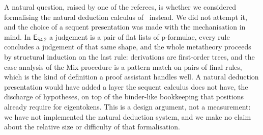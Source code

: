 \documentclass{article}
\newcommand{\spotlight}[1]{#1}
\newcommand{\eseq}{\mathsf{E}_{{\textsf{S4.2}}}}
\theoremstyle{definition}
\begin{document}
A natural question, raised by one of the referees, is whether we considered formalising the natural deduction calculus of~\cite{Martini2024:S42NaturalDeduction} instead. We did not attempt it, and the choice of a sequent presentation was made with the mechanisation in mind. In $\eseq$ a judgement is a pair of flat lists of p-formulae, every rule concludes a judgement of that same shape, and the whole metatheory proceeds by structural induction on the last rule: derivations are first-order trees, and the case analysis of the Mix procedure is a pattern match on pairs of final rules, which is the kind of definition a proof assistant handles well. A natural deduction presentation would have added a layer the sequent calculus does not have, the discharge of hypotheses, on top of the binder-like bookkeeping that positions already require for eigentokens. \spotlight{This is a design argument, not a measurement: we have not implemented the natural deduction system, and we make no claim about the relative size or difficulty of that formalisation.}
\end{document}
